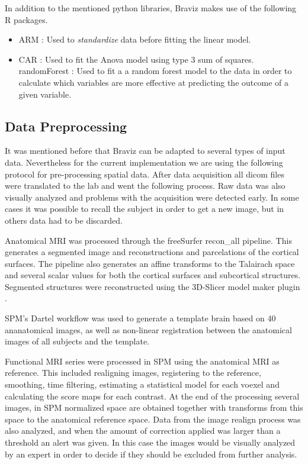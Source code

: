 In addition to the mentioned python libraries, Braviz makes use of the following R packages.

\begin{itemize}
\item ARM \autocite{gelman_arm:_2015}: Used to \emph{standardize} data before fitting the linear model.
\item CAR \autocite{fox_car:_2015}: Used to fit the Anova model using type 3 sum of squares.
\irem randomForest \autocite{cutler_randomforest:_2014}: Used to fit a a random forest model to the data in order to calculate which variables are more effective at predicting the outcome of a given variable.
\end{itemize}

\subsection{Data Preprocessing}

It was mentioned before that Braviz can be adapted to several types of input data. Nevertheless for the current implementation we are using the following protocol for pre-processing spatial data. After data acquisition all dicom files were translated to the lab and went the following process. Raw data was also visually analyzed and problems with the acquisition were detected early. In some cases it was possible to recall the subject in order to get a new image, but in others data had to be discarded.

Anatomical MRI was processed through the freeSurfer \autocite{dale_cortical_1999} recon\_all pipeline. This generates a segmented image and reconstructions and parcelations of the cortical surfaces. The pipeline also generates an affine transforms to the Talairach space and several scalar values for both the cortical surfaces and subcortical structures. Segmented structures were reconstructed using the 3D-Slicer model maker plugin \autocite{aucoin_modelmaker_2014}. 

SPM's Dartel \autocite{ashburner_fast_2007} workflow was used to generate a template brain based on 40 ananatomical images, as well as non-linear registration between the anatomical images of all subjects and the template. 

Functional MRI series were processed in SPM \autocite{friston_statistical_2006} using the anatomical MRI as reference. This included realigning images, registering to the reference, smoothing, time filtering, estimating a statistical model for each voexel and calculating the score maps for each contrast. At the end of the processing several images, in SPM normalized space are obtained together with transforms from this space to the anatomical reference space. Data from the image realign process was also analyzed, and when the amount of correction applied was larger than a threshold an alert was given. In this case the images would be visually analyzed by an expert in order to decide if they should be excluded from further  analysis.


